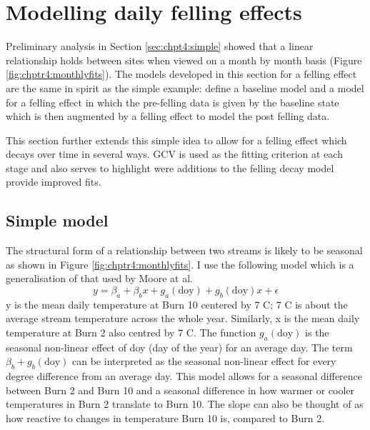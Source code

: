 




\section{Modelling daily felling effects}

Preliminary analysis in Section \ref{sec:chpt4:simple} showed that a linear relationship holds between sites when viewed on a month by month basis (Figure \ref{fig:chptr4:monthlyfits}). The models developed in this section for a felling effect are the same in spirit as the simple example: define a baseline model and a model for a felling effect in which the pre-felling data is given by the baseline state which is then augmented by a felling effect to model the post felling data.

This section further extends this simple idea to allow for a felling effect which decays over time in several ways.  GCV is used as the fitting criterion at each stage and also serves to highlight were additions to the felling decay model provide improved fits.




\subsection{Simple model}


The structural form of a relationship between two streams is likely to be seasonal as shown in Figure \ref{fig:chptr4:monthlyfits}.  I use the following model which is a generalisation of that used by Moore at al.
\begin{equation}
  y = \beta_a + \beta_b x + g_a(\text{doy}) + g_b(\text{doy})x + \epsilon
\end{equation}
y is the mean daily temperature at Burn 10 centered by 7 \degrees C; 7 \degrees C is about the average stream temperature across the whole year. Similarly, x is the mean daily temperature at Burn 2 also centred by 7 \degrees C. The function $g_a(\text{doy})$ is the seasonal non-linear effect of doy (day of the year) for an average day.  The term $\beta_b + g_b(\text{doy})$ can be interpreted as the seasonal non-linear effect for every degree difference from an average day.  This model allows for a seasonal difference between Burn 2 and Burn 10 and a seasonal difference in how warmer or cooler temperatures in Burn 2 translate to Burn 10. The slope can also be thought of as how reactive to changes in temperature Burn 10 is, compared to Burn 2.

